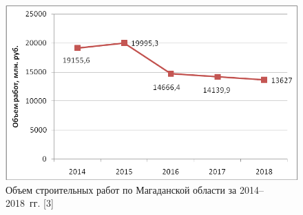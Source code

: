 \begin{figure}[h!]

  \begin{center}
    \includegraphics[width=1\textwidth]{authors/serebryakova-fig-2.png}
  \end{center}

  \caption{Объем строительных работ по Магаданской области
за 2014--2018~гг. [3]}
  \label{fig:serebryakova-fig-2}
\end{figure}
